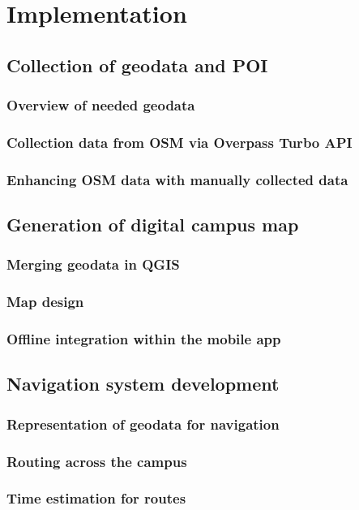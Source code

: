 \chapter{Implementation}
\label{cha:implementation}
\section{Collection of geodata and POI}
\subsection{Overview of needed geodata}
\subsection{Collection data from OSM via Overpass Turbo API}
\subsection{Enhancing OSM data with manually collected data}

\section{Generation of digital campus map}
\subsection{Merging geodata in QGIS}
\subsection{Map design}
\subsection{Offline integration within the mobile app}

\section{Navigation system development}
\subsection{Representation of geodata for navigation}
\subsection{Routing across the campus}
\subsection{Time estimation for routes}
